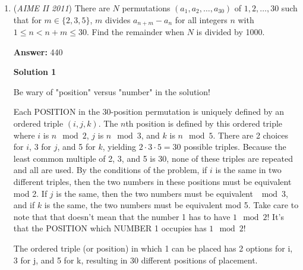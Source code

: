 \begin{enumerate}
 \[BP = DP,    \angle PAB =\angle PCD  = 45^\circ \implies  O_{1}P =O_{2}P\]  by the Law of Sines.

 
 \[AB= CD, O_{1}A = O_{2}D = O_{1}B = O_{2}C \implies \triangle AO_{1}B = \triangle DO_{2}C.\] They have translational symmetry. The translation vector is 
 \[\vec {AD} \implies  O_{1}O_{2} = AD.\]

 \[\triangle PO_{1}O_{2} = \triangle O_{1}AB \implies \angle AO_{1}B = 120^\circ \implies\]
 \[\angle APB = 60^\circ \implies  \angle ABP = 180^\circ – 60^\circ – 45^\circ = 75^\circ.\]By the Law of Sines 
 \[AP = \frac {AB \cdot \sin 75^\circ}{\sin 60^\circ} = \frac {AB \cdot \sin (30^\circ + 45^\circ)} {\sin 60^\circ}\]
 \[AP  = AB \cdot (\sin 45^\circ + \cos 45^\circ \cdot \tan 30^\circ),\]
 \[AP = \frac {AB}{\sqrt{2}} (1 + \frac {1}{\sqrt{3}}) = 6 \sqrt {2} + 2 \sqrt {6} \implies \boxed{\textbf{096}.}\]\textbf{vladimir.shelomovskii@gmail.com, vvsss}

 


	\item (\textit{AIME II 2011}) There are $N$ permutations $(a_1, a_2, \dots, a_{30})$ of $1, 2, \dots, 30$ such that for $m \in \{2,3,5\}$, $m$ divides $a_{n+m} - a_n$ for all integers $n$ with $1 \le n < n+m \le 30$. Find the remainder when $N$ is divided by 1000.


 
 \textbf{Answer: }440



\textbf{Solution 1}

Be wary of "position" versus "number" in the solution!

 Each POSITION in the 30-position permutation is uniquely defined by an ordered triple $(i, j, k)$. The $n$th position is defined by this ordered triple where $i$ is $n \mod 2$, $j$ is $n \mod 3$, and $k$ is $n \mod 5$. There are 2 choices for $i$, 3 for $j$, and 5 for $k$, yielding $2 \cdot 3 \cdot 5=30$ possible triples. Because the least common multiple of 2, 3, and 5 is 30, none of these triples are repeated and all are used. By the conditions of the problem, if $i$ is the same in two different triples, then the two numbers in these positions must be equivalent mod 2. If $j$ is the same, then the two numbers must be equivalent $\mod 3$, and if $k$ is the same, the two numbers must be equivalent mod 5. Take care to note that that doesn't mean that the number 1 has to have $1 \mod 2$! It's that the POSITION which NUMBER 1 occupies has $1 \mod 2$!

 The ordered triple (or position) in which 1 can be placed has 2 options for i, 3 for j, and 5 for k, resulting in 30 different positions of placement.


\end{enumerate}
